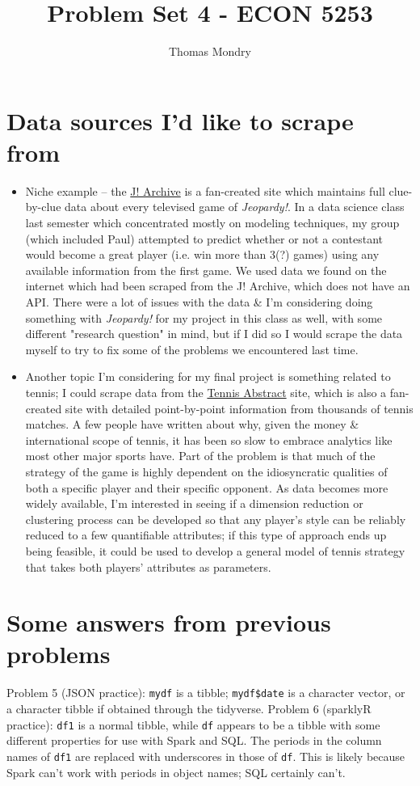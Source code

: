 \documentclass{article}
\title{Problem Set 4 - ECON 5253}
\author{Thomas Mondry}
\begin{document}
\maketitle

\section{Data sources I'd like to scrape from}

\begin{itemize}
    \item Niche example -- the \href{https://j-archive.com/}{J! Archive} is a fan-created site which maintains full clue-by-clue data about every televised game of \textit{Jeopardy!}. In a data science class last semester which concentrated mostly on modeling techniques, my group (which included Paul) attempted to predict whether or not a contestant would become a great player (i.e. win more than 3(?) games) using any available information from the first game. We used data we found on the internet which had been scraped from the J! Archive, which does not have an API. There were a lot of issues with the data \& I'm considering doing something with \textit{Jeopardy!} for my project in this class as well, with some different "research question" in mind, but if I did so I would scrape the data myself to try to fix some of the problems we encountered last time.
    \item Another topic I'm considering for my final project is something related to tennis; I could scrape data from the \href{https://www.tennisabstract.com/}{Tennis Abstract} site, which is also a fan-created site with detailed point-by-point information from thousands of tennis matches. A few people have written about why, given the money \& international scope of tennis, it has been so slow to embrace analytics like most other major sports have. Part of the problem is that much of the strategy of the game is highly dependent on the idiosyncratic qualities of both a specific player and their specific opponent. As data becomes more widely available, I'm interested in seeing if a dimension reduction or clustering process can be developed so that any player's style can be reliably reduced to a few quantifiable attributes; if this type of approach ends up being feasible, it could be used to develop a general model of tennis strategy that takes both players' attributes as parameters.
\end{itemize}

\section{Some answers from previous problems}

Problem 5 (JSON practice): \texttt{mydf} is a tibble; \texttt{mydf\$date} is a character vector, or a character tibble if obtained through the tidyverse.
\hfill \break \break
Problem 6 (sparklyR practice): \texttt{df1} is a normal tibble, while \texttt{df} appears to be a tibble with some different properties for use with Spark and SQL. The periods in the column names of \texttt{df1} are replaced with underscores in those of \texttt{df}. This is likely because Spark can't work with periods in object names; SQL certainly can't.
\end{document}
